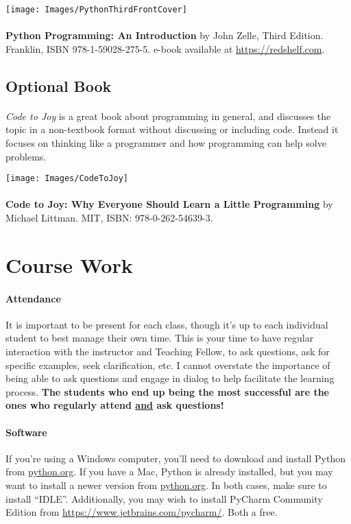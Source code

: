 \documentclass[letter,10pt]{article}
\begin{document}
\texttt{[image: Images/PythonThirdFrontCover]}

\paragraph{}\textbf{Python Programming: An Introduction} by John Zelle, Third Edition. Franklin, ISBN 978-1-59028-275-5. e-book available at \url{https://redshelf.com}.

\subsection*{Optional Book}
\paragraph{}\textit{Code to Joy} is a great book about programming in general, and discusses the topic in a non-textbook format without discussing or including code. Instead it focuses on thinking like a programmer and how programming can help solve problems.

\texttt{[image: Images/CodeToJoy]}

\paragraph{}\textbf{Code to Joy: Why Everyone Should Learn a Little Programming} by Michael Littman. MIT, ISBN: 978-0-262-54639-3.

\section*{Course Work}\label{sec:coursework}
\paragraph{Attendance}It is important to be present for each class, though it's up to each individual student to best manage their own time. This is your time to have regular interaction with the instructor and Teaching Fellow, to ask questions, ask for specific examples, seek clarification, etc. I cannot overstate the importance of being able to ask questions and engage in dialog to help facilitate the learning process. \textbf{The students who end up being the most successful are the ones who regularly attend \underline{and} ask questions!}

\paragraph{Software}If you're using a Windows computer, you'll need to download and install Python from \href{https://www.python.org/downloads/windows/}{python.org}. If you have a Mac, Python is already installed, but you may want to install a newer version from \href{https://www.python.org/downloads/macos/}{python.org}. In both cases, make sure to install ``IDLE''. Additionally, you may wish to install PyCharm Community Edition from \url{https://www.jetbrains.com/pycharm/}. Both a free.
\end{document}
